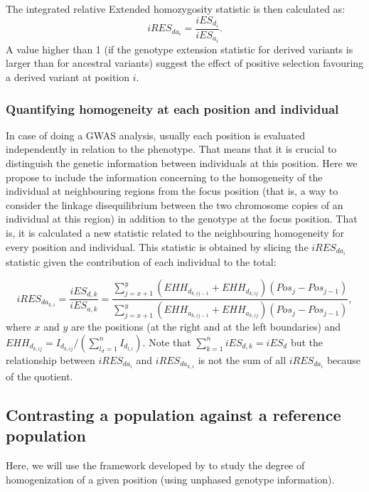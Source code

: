 \documentclass[a4paper,11pt]{article}
\begin{document}
The integrated relative Extended homozygosity statistic is then calculated as:
 \begin{equation}
 iRES_{da_{i}} = \frac{iES_{d_{i}}} {iES_{a_{i}}}.
 \end{equation}
A value higher than 1 (if the genotype extension statistic for derived variants is larger than for ancestral variants) suggest the effect of positive selection favouring a derived variant at position $i$.  

\subsubsection{Quantifying homogeneity at each position and individual}
In case of doing a GWAS analysis, usually each position is evaluated independently in relation to the phenotype. That means that it is crucial to distinguish the genetic information between individuals at this position. Here we propose to include the information concerning to the homogeneity of the individual at neighbouring regions from the focus position (that is, a way to consider the linkage disequilibrium between the two chromosome copies of an individual at this region) in addition to the genotype at the focus position. That is, it is calculated a new statistic related to the neighbouring homogeneity for every position and individual. This statistic is obtained by slicing the $iRES_{da_i}$ statistic given the contribution of each individual to the total:

 \begin{equation}
 iRES_{da_{k,i}} =  \frac{iES_{d,k}}{iES_{a,k}} = \frac{\sum_{j=x+1}^{y}(EHH_{d_{k,ij-1}}+ EHH_{d_{k,ij}})(Pos_{j} - Pos_{j-1})}  {\sum_{j=x+1}^{y}(EHH_{a_{k,ij-1}}+ EHH_{a_{k,ij}})(Pos_{j} - Pos_{j-1})},
 \end{equation}
where $x$ and $y$ are the positions (at the right and at the left boundaries) and $EHH_{d_{k,ij}} = I_{d_{k,ij}} / (\sum_{l_d=1}^{n}I_{d_{l,i}})$. Note that $\sum_{k=1}^{n}iES_{d,k}=iES_d$ but the relationship between $iRES_{da_{i}}$ and $iRES_{da_{k,i}}$ is not the sum of all $iRES_{da_i}$ because of the quotient.

\subsection{Contrasting a population against a reference population}
Here, we will use the framework developed by \cite{Tang:2007by} to study the degree of homogenization of a given position (using unphased genotype information).
\end{document}

